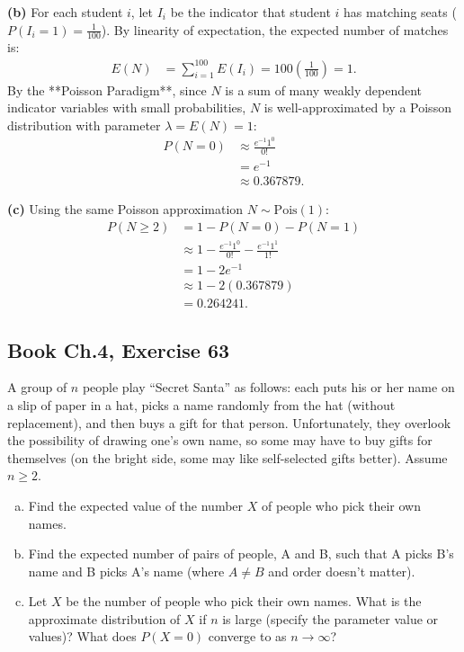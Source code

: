 \documentclass[11pt,a4paper]{article}
\begin{document}
\vspace{4pt}
\noindent \textbf{(b)} For each student $i$, let $I_i$ be the indicator that student $i$ has matching seats ($P(I_i = 1) = \frac{1}{100}$). By linearity of expectation, the expected number of matches is:
\begin{align*}
E(N) &= \sum_{i=1}^{100} E(I_i) = 100 \left(\frac{1}{100}\right) = 1.
\end{align*}
By the **Poisson Paradigm**, since $N$ is a sum of many weakly dependent indicator variables with small probabilities, $N$ is well-approximated by a Poisson distribution with parameter $\lambda = E(N) = 1$:
\begin{align*}
P(N = 0) &\approx \frac{e^{-1} 1^0}{0!} \\
&= e^{-1} \\
&\approx 0.367879.
\end{align*}

\vspace{4pt}
\noindent \textbf{(c)} Using the same Poisson approximation $N \sim \text{Pois}(1)$:
\begin{align*}
P(N \ge 2) &= 1 - P(N = 0) - P(N = 1) \\
&\approx 1 - \frac{e^{-1} 1^0}{0!} - \frac{e^{-1} 1^1}{1!} \\
&= 1 - 2e^{-1} \\
&\approx 1 - 2(0.367879) \\
&= 0.264241.
\end{align*}

\vspace{10pt}
\subsection{Book Ch.4, Exercise 63}
\begin{tcolorbox}[title={Book Ch.4, Exercise 63}]
A group of $n$ people play ``Secret Santa'' as follows: each puts his or her name on a slip of paper in a hat, picks a name randomly from the hat (without replacement), and then buys a gift for that person. Unfortunately, they overlook the possibility of drawing one's own name, so some may have to buy gifts for themselves (on the bright side, some may like self-selected gifts better). Assume $n \ge 2$.
\begin{enumerate}[(a)]
\item Find the expected value of the number $X$ of people who pick their own names.
\item Find the expected number of pairs of people, A and B, such that A picks B's name and B picks A's name (where $A \neq B$ and order doesn't matter).
\item Let $X$ be the number of people who pick their own names. What is the approximate distribution of $X$ if $n$ is large (specify the parameter value or values)? What does $P(X = 0)$ converge to as $n \rightarrow \infty$?
\end{enumerate}
\end{tcolorbox}
\end{document}
